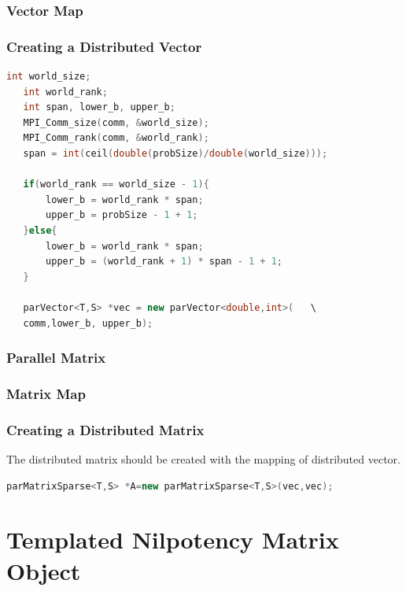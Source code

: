 \documentclass[a4paper, 10 pt]{report}
\begin{document}
	\subsection{Vector Map}
	\subsection{Creating a Distributed Vector}
	
	\begin{lstlisting}[language=C++,frame=single]
   int world_size;
   int world_rank;
   int span, lower_b, upper_b;
   MPI_Comm_size(comm, &world_size);
   MPI_Comm_rank(comm, &world_rank);
   span = int(ceil(double(probSize)/double(world_size)));
   
   if(world_rank == world_size - 1){
       lower_b = world_rank * span;
       upper_b = probSize - 1 + 1;
   }else{
       lower_b = world_rank * span;
       upper_b = (world_rank + 1) * span - 1 + 1;
   }
   
   parVector<T,S> *vec = new parVector<double,int>(   \
   comm,lower_b, upper_b);
	\end{lstlisting}
	
	\subsection{Parallel Matrix}
	\subsection{Matrix Map}
	\subsection{Creating a Distributed Matrix}
	
	The distributed matrix should be created with the mapping of distributed vector.
	
	
	\begin{lstlisting}[language=C++,frame=single]
parMatrixSparse<T,S> *A=new parMatrixSparse<T,S>(vec,vec);
	\end{lstlisting}
	
	\newpage
	\chapter{Templated  Nilpotency Matrix Object}
\end{document}
